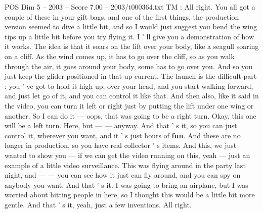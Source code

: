 \begin{textsample}{POS Dim 5 – 2003 – Score 7.00 – 2003/t000364.txt}
TM : All right.
You all got a couple of these in your gift bags, and one of the first things, the production version seemed to dive a little bit, and so I would just suggest you bend the wing tips up a little bit before you try flying it.
I ' ll give you a demonstration of how it works.
The idea is that it soars on the lift over your body, like a seagull soaring on a cliff.
As the wind comes up, it has to go over the cliff, so as you walk through the air, it goes around your body, some has to go over you.
And so you just keep the glider positioned in that up current.
The launch is the difficult part : you ' ve got to hold it high up, over your head, and you start walking forward, and just let go of it, and you can control it like that.
And then also, like it said in the video, you can turn it left or right just by putting the lift under one wing or another.
So I can do it — oops, that was going to be a right turn.
Okay, this one will be a left turn.
Here, but — — anyway.
And that ' s it, so you can just control it, wherever you want, and it ' s just hours of \textbf{fun}.
And these are no longer in production, so you have real collector ' s items.
And this, we just wanted to show you — if we can get the video running on this, yeah — just an example of a little video surveillance.
This was flying around in the party last night, and — — you can see how it just can fly around, and you can spy on anybody you want.
And that ' s it.
I was going to bring an airplane, but I was worried about hitting people in here, so I thought this would be a little bit more gentle.
And that ' s it, yeah, just a few inventions.
All right.

\end{textsample}
